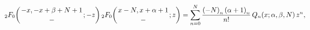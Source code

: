\[\mathop{{{}_{2}F_{0}}\/}\nolimits\!\left({-x,-x+\beta+N+1\atop-};-z\right)\*%
\mathop{{{}_{2}F_{0}}\/}\nolimits\!\left({x-N,x+\alpha+1\atop-};z\right)=\sum_%
{n=0}^{N}\frac{\left(-N\right)_{n}\left(\alpha+1\right)_{n}}{n!}\mathop{Q_{n}%
\/}\nolimits\!\left(x;\alpha,\beta,N\right)z^{n},\]